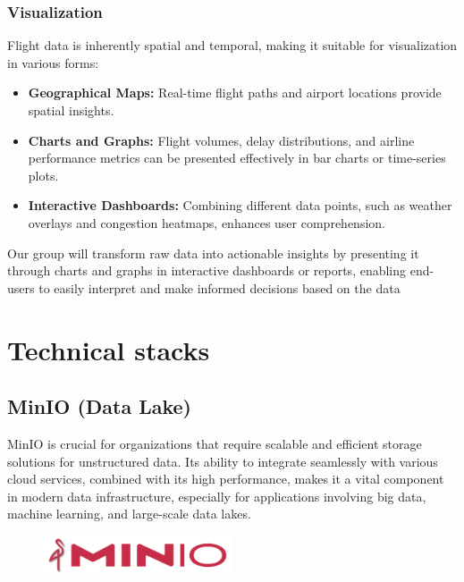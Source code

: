\documentclass[12pt,a4paper]{article}
\begin{document}
\subsubsection{Visualization}
Flight data is inherently spatial and temporal, making it suitable for
visualization in various forms:
\begin{itemize}
    \item \textbf{Geographical Maps:} Real-time flight paths and airport
    locations provide spatial insights.
    \item \textbf{Charts and Graphs:} Flight volumes, delay distributions, and
    airline performance metrics can be presented effectively in bar charts or
    time-series plots.
    \item \textbf{Interactive Dashboards:} Combining different data points, such
    as weather overlays and congestion heatmaps, enhances user comprehension.
\end{itemize}
Our group will transform raw data into actionable insights by presenting it
through charts and graphs in interactive dashboards or reports, enabling
end-users to easily interpret and make informed decisions based on the data

\section{Technical stacks}
\subsection{MinIO (Data Lake)}
MinIO is crucial for organizations that require scalable and efficient storage solutions for unstructured data. Its ability to integrate seamlessly with various cloud services, combined with its high performance, makes it a vital component in modern data infrastructure, especially for applications involving big data, machine learning, and large-scale data lakes.\cite{simplyblock_minio}
\begin{figure}[h!]
    \begin{center}
        \includegraphics[width=0.5\textwidth]{Images/minIO.png}
    \end{center}
\end{figure}
\end{document}
